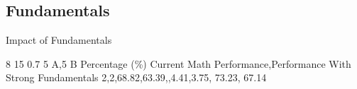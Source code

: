 \label{2.2 C5 A,5 BM Impact of Fundamentals}
\subsection{Fundamentals}
\renewcommand{\insertclass}{ - Class 5 A,5 B }
\renewcommand{\insertsubject}{- Math}

\begin{frame}{Impact of Fundamentals}


\centering
\impactOfFundamentals
    {8}
    {15}
    {0.7}
    {5 A,5 B}
    {Percentage (\%)}
    {Current Math Performance,Performance With Strong Fundamentals}
    {
        {2},{2},{68.82,63.39,},{4.41,3.75,}
    }
    {}
    {{73.23, 67.14}}


\end{frame}


%


        



